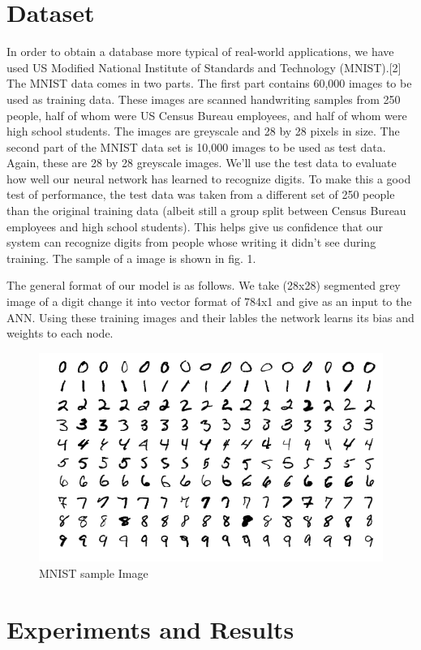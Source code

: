 \documentclass[conference]{IEEEtran}
\begin{document}
\section{Dataset}
In order to obtain a database more typical of real-world applications, we have used US Modified National Institute of Standards and Technology (MNIST).[2] The MNIST data comes in two parts. The first part contains 60,000 images to be used as training data. These images are scanned handwriting samples from 250 people, half of whom were US Census Bureau employees, and half of whom were high school students. The images are greyscale and 28 by 28 pixels in size. The second part of the MNIST data set is 10,000 images to be used as test data. Again, these are 28 by 28 greyscale images. We'll use the test data to evaluate how well our neural network has learned to recognize digits. To make this a good test of performance, the test data was taken from a different set of 250 people than the original training data (albeit still a group split between Census Bureau employees and high school students). This helps give us confidence that our system can recognize digits from people whose writing it didn't see during training. The sample of a image is shown in fig. 1.\newline

The general format of our model is as follows. We take (28x28) segmented grey image of a digit change it into vector format of 784x1 and give as an input to the ANN. Using these training images and their lables the network learns its bias and weights to each node. 
\begin{figure}[h]
	\centering
	\includegraphics[width=\linewidth]{"MNIST sample image"}
	\caption{MNIST sample Image}
	\label{Fig:1}
\end{figure}
\section{Experiments and Results}
\end{document}
